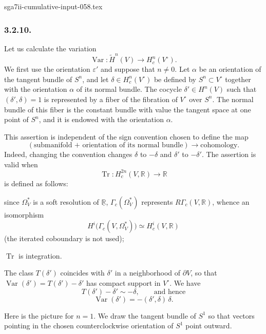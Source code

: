 \begin{filecontents*}{sga7ii-cumulative-input-058.tex}
\subsubsection*{3.2.10.}
Let us calculate the variation
\[
\operatorname{Var}:\widetilde H^n(V)
\longrightarrow H_c^n(V^\circ).
\]
We first use the orientation $\varepsilon'$ and suppose that $n\ne0$.
Let $\alpha$ be an orientation of the tangent bundle of $S^n$, and
let $\delta\in H_c^n(V^\circ)$ be defined by
$S^n\subset V^\circ$ together with the orientation $\alpha$ of its
normal bundle.  The cocycle $\delta'\in H^n(V)$ such that
$(\delta',\delta)=1$ is represented by a fiber of the fibration of
$V^\circ$ over $S^n$.  The normal bundle of this fiber is the constant
bundle with value the tangent space at one point of $S^n$, and it is
endowed with the orientation $\alpha$.

This assertion is independent of the sign convention chosen to define
the map
\[
(\text{submanifold + orientation of its normal bundle})
\longrightarrow\text{cohomology}.
\]
Indeed, changing the convention changes $\delta$ to $-\delta$ and
$\delta'$ to $-\delta'$.  The assertion is valid when
\[
\operatorname{Tr}:H_c^{2n}(V,\mathbb R)\longrightarrow\mathbb R
\]
is defined as follows:
\begin{description}[leftmargin=2.8em,labelsep=.5em]
\item[\textup{($\alpha$)}] since $\Omega_V^*$ is a soft resolution of $\underline{\mathbb R}$,
  $\Gamma_c(\Omega_V^*)$ represents $R\Gamma_c(V,\mathbb R)$, whence
  an isomorphism
  \[
  H^i\bigl(\Gamma_c(V,\Omega_V^*)\bigr)
  \simeq H_c^i(V,\mathbb R)
  \]
  (the iterated coboundary is not used);
\item[\textup{($\beta$)}] $\operatorname{Tr}$ is integration.
\end{description}

The class $T(\delta')$ coincides with $\delta'$ in a neighborhood of
$\partial V$, so that
\(
\operatorname{Var}(\delta')=T(\delta')-\delta'
\)
has compact support in $V^\circ$.  We have
\[
T(\delta')-\delta'\sim-\delta,
\qquad\text{and hence}
\]
\[
\operatorname{Var}(\delta')
=-(\delta',\delta)\,\delta.
\]

Here is the picture for $n=1$.  We draw the tangent bundle of $S^1$
so that vectors pointing in the chosen counterclockwise orientation of
$S^1$ point outward.


\end{filecontents*}
